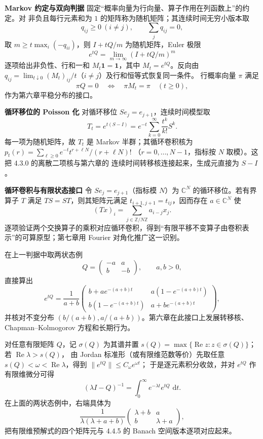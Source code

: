 \documentclass[11pt,a4paper]{ctexart}
\newcommand{\dd}{\,\mathrm d}
\newcommand{\planitem}[1]{\par\smallskip\noindent\textcolor{deepblue}{\textbf{#1}}\quad}
\begin{document}
\planitem{Markov 约定与双向判据}
固定“概率向量为行向量、算子作用在列函数上”的约定。对
非负且每行元素和为 $1$ 的矩阵称为随机矩阵；其连续时间无穷小版本取
\[
q_{ij}\ge0\ (i\ne j),\qquad \sum_jq_{ij}=0,
\]
取 $m\ge t\max_i(-q_{ii})$，则 $I+tQ/m$ 为随机矩阵，Euler 极限
\[
 e^{tQ}=\lim_{m\to\infty}(I+tQ/m)^m
\]
逐项给出非负性、行和一和 $M_t\mathbf1=\mathbf1$，其中 $M_t=e^{tQ}$。反向由
$q_{ij}=\lim_{t\downarrow0}(M_t)_{ij}/t$（$i\ne j$）及行和恒等式恢复同一条件。
行概率向量 $\pi$ 满足
\[
 \pi Q=0\quad\Longleftrightarrow\quad \pi M_t=\pi\quad(t\ge0),
\]
作为第六章平稳分布的接口。

\planitem{循环移位的 Poisson 化}
对循环移位 $S e_j=e_{j+1}$，连续时间模型取
\[
 T_t=e^{t(S-I)}=e^{-t}\sum_{k=0}^{\infty}\frac{t^k}{k!}S^k .
\]
每一项为随机矩阵，故 $T_t$ 是 Markov 半群；其循环卷积核为
$p_t(r)=\sum_{\ell\ge0}e^{-t}t^{r+\ell N}/(r+\ell N)!$
（$r=0,\ldots,N-1$，指标按 $N$ 取模）。这把 4.3.0 的离散二项核与第六章的
连续时间转移核连接起来，生成元直接为 $S-I$。

\planitem{循环卷积与有限状态接口}
令 $S e_j=e_{j+1}$（指标模 $N$）为 $\mathbb C^N$ 的循环移位。若有界算子 $T$ 满足
$TS=ST$，则其矩阵元满足 $t_{i+1,j+1}=t_{ij}$，因而存在 $a\in\mathbb C^N$ 使
\[
 (Tx)_i=\sum_{j\in\mathbb Z/N\mathbb Z}a_{i-j}x_j.
\]
逐项验证两个交换算子的乘积对应循环卷积，得到“有限平移不变算子由卷积表示”的可算原型；第七章用 Fourier 对角化推广这一识别。

在上一判据中取两状态例
\[
 Q=\begin{pmatrix}-a&a\\ b&-b\end{pmatrix},\qquad a,b>0,
\]
直接算出
\[
 e^{tQ}=\frac1{a+b}
 \begin{pmatrix}b+ae^{-(a+b)t}&a(1-e^{-(a+b)t})\\
 b(1-e^{-(a+b)t})&a+be^{-(a+b)t}\end{pmatrix},
\]
并核对不变分布 $(b/(a+b),a/(a+b))$。第六章在此接口上发展转移核、Chapman--Kolmogorov 方程和长期行为。

对任意有限矩阵 $Q$，记 $\sigma(Q)$ 为其谱并置
$s(Q)=\max\{\operatorname{Re}z:z\in\sigma(Q)\}$；若 $\operatorname{Re}\lambda>s(Q)$，
由 Jordan 标准形（或有限维范数等价）先取任意
$s(Q)<\omega<\operatorname{Re}\lambda$，得到 $\|e^{tQ}\|\le C_\omega e^{\omega t}$；
于是逐元素积分收敛，并对 $e^{tQ}$ 作有限维微分可得
\[
 (\lambda I-Q)^{-1}=\int_0^\infty e^{-\lambda t}e^{tQ}\,\dd t.
\]
在上面的两状态例中，右端具体为
\[
 \frac1{\lambda(\lambda+a+b)}
 \begin{pmatrix}\lambda+b&a\\ b&\lambda+a\end{pmatrix},
\]
把有限维预解式的四个矩阵元与 4.4.5 的 Banach 空间版本逐项对应起来。
\end{document}
